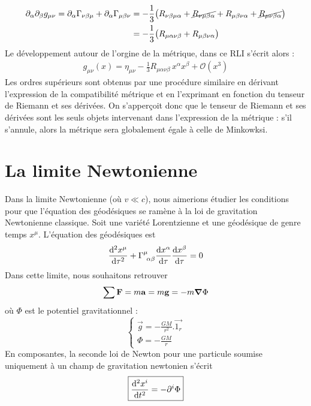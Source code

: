 \begin{align}
    \partial_\alpha \partial_\beta g_{\mu\nu} = \partial_\alpha \Gamma_{\nu\beta\mu} + \partial_\alpha \Gamma_{\mu\beta\nu} &= - \frac{1}{3} \big (R_{\nu\beta\mu\alpha} + \cancel{R_{\nu\mu\beta\alpha}} + R_{\mu\beta\nu\alpha} + \cancel{R_{\mu\nu\beta\alpha}}\big)\\
    &= - \frac{1}{3} \big( R_{\mu\alpha\nu\beta} + R_{\mu\beta\nu\alpha} \big)
\end{align}
Le développement autour de l'orgine de la métrique, dans ce RLI s'écrit alors :
\begin{align}
    g_{\mu\nu}(x) = \eta_{\mu\nu} - \frac{1}{3} R_{\mu\alpha\nu\beta} \,x^\alpha x^\beta + \mathcal{O}(x^3)
\end{align}
Les ordres supérieurs sont obtenus par une procédure similaire en dérivant l'expression de la compatibilité métrique et en l'exprimant en fonction du tenseur de Riemann et ses dérivées. On s'apperçoit donc que le tenseur de Riemann et ses dérivées sont les seuls objets intervenant dans l'expression de la métrique : s'il s'annule, alors la métrique sera globalement égale à celle de Minkowksi.
\section{La limite Newtonienne}
Dans la limite Newtonienne (où $v \ll c$), nous aimerions étudier les conditions pour que l'équation des géodésiques se ramène à la loi de gravitation Newtonienne classique. Soit une variété Lorentzienne et une géodésique de genre temps $x^\mu$. L'équation des géodésiques est
\begin{equation}
    \frac{\td^2 x^{\mu}}{\td \tau^2} + \Gamma\indices{^{\mu}_{\!\alpha \beta}}\frac{\td x^{\alpha}}{\td \tau}\frac{\td x^{\beta}}{\td \tau} = 0
\end{equation}
Dans cette limite, nous souhaitons retrouver 
\begin{equation}
    \sum \bm{\mathrm{F}} = m\bm{\mathrm{a}} = m\bm{\mathrm{g}} = -m\bm{\mathrm{\nabla}}\Phi
\end{equation}
où $\Phi$ est le potentiel gravitationnel :
\begin{equation}
\left\{
\begin{array}{l}
\Vec{g} = -\frac{GM}{r^2}.\Vec{1_{r}}\\
\Phi = - \frac{GM}{r}
\end{array}
\right.
\end{equation}
En composantes, la seconde loi de Newton pour une particule soumise uniquement à un champ de gravitation newtonien s'écrit
\begin{equation}
    \label{eq:grav newt}
    \boxed{\frac{\mathrm{d}^2 x^{i}}{\mathrm{d} t^2} = -\partial^{i}\Phi}
\end{equation}
\pagebreak
